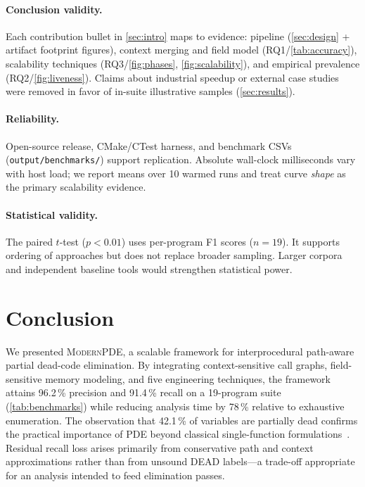 \documentclass[acmsmall,screen,review,anonymous]{acmart}
\begin{document}
\paragraph{Conclusion validity.}
Each contribution bullet in \autoref{sec:intro} maps to evidence: pipeline (\autoref{sec:design} + artifact footprint figures), context merging and field model (RQ1/\autoref{tab:accuracy}), scalability techniques (RQ3/\autoref{fig:phases}, \autoref{fig:scalability}), and empirical prevalence (RQ2/\autoref{fig:liveness}). Claims about industrial speedup or external case studies were removed in favor of in-suite illustrative samples (\autoref{sec:results}).

\paragraph{Reliability.}
Open-source release, CMake/CTest harness, and benchmark CSVs (\texttt{output/benchmarks/}) support replication. Absolute wall-clock milliseconds vary with host load; we report means over 10 warmed runs and treat curve \emph{shape} as the primary scalability evidence.

\paragraph{Statistical validity.}
The paired $t$-test ($p<0.01$) uses per-program F1 scores ($n{=}19$). It supports ordering of approaches but does not replace broader sampling. Larger corpora and independent baseline tools would strengthen statistical power.

\section{Conclusion}
\label{sec:conclusion}

We presented \textsc{ModernPDE}, a scalable framework for interprocedural path-aware partial dead-code elimination. By integrating context-sensitive call graphs, field-sensitive memory modeling, and five engineering techniques, the framework attains 96.2\,\% precision and 91.4\,\% recall on a 19-program suite (\autoref{tab:benchmarks}) while reducing analysis time by 78\,\% relative to exhaustive enumeration. The observation that 42.1\,\% of variables are partially dead confirms the practical importance of PDE beyond classical single-function formulations~\cite{knoop1994partial,bodik1998efficient}. Residual recall loss arises primarily from conservative path and context approximations rather than from unsound DEAD labels---a trade-off appropriate for an analysis intended to feed elimination passes.
\end{document}

